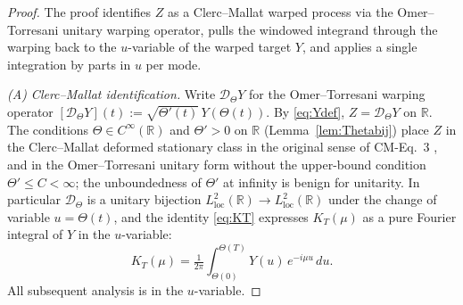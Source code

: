 \documentclass[11pt]{article}
\begin{document}
\begin{proof}
The proof identifies $Z$ as a Clerc--Mallat warped process via the Omer--Torresani unitary warping operator, pulls the windowed integrand through the warping back to the $u$-variable of the warped target $Y$, and applies a single integration by parts in $u$ per mode.

\medskip
\noindent\emph{(A) Clerc--Mallat identification.} Write $\mathcal D_\Theta Y$ for the Omer--Torresani warping operator $[\mathcal D_\Theta Y](t):=\sqrt{\Theta'(t)}\,Y(\Theta(t))$. By \eqref{eq:Ydef}, $Z=\mathcal D_\Theta Y$ on $\mathbb R$. The conditions $\Theta\in C^\infty(\mathbb R)$ and $\Theta'>0$ on $\mathbb R$ (Lemma~\ref{lem:Thetabij}) place $Z$ in the Clerc--Mallat deformed stationary class in the original sense of CM-Eq.~3 \cite{ClercMallat2003}, and in the Omer--Torresani unitary form without the upper-bound condition $\Theta'\le C<\infty$; the unboundedness of $\Theta'$ at infinity is benign for unitarity. In particular $\mathcal D_\Theta$ is a unitary bijection $L^2_{\mathrm{loc}}(\mathbb R)\to L^2_{\mathrm{loc}}(\mathbb R)$ under the change of variable $u=\Theta(t)$, and the identity \eqref{eq:KT} expresses $K_T(\mu)$ as a pure Fourier integral of $Y$ in the $u$-variable:
\begin{equation}\label{eq:KT-u}
K_T(\mu)=\tfrac{1}{2\pi}\int_{\Theta(0)}^{\Theta(T)}Y(u)\,e^{-i\mu u}\,du.
\end{equation}
All subsequent analysis is in the $u$-variable.


\end{proof}
\end{document}
